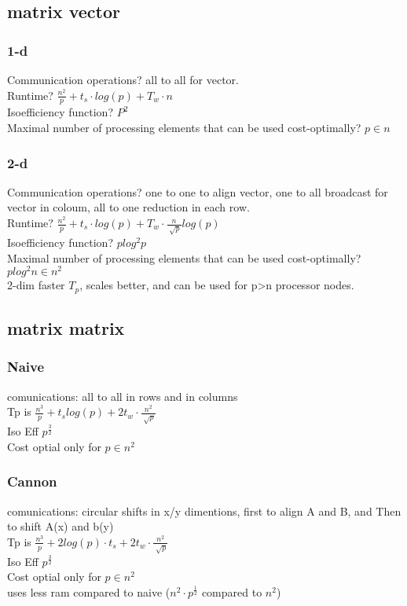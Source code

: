 \documentclass[a4paper,10pt,titlepage]{report}
\begin{document}
\subsection{matrix vector}
\subsubsection{1-d}
       Communication operations? all to all for vector.\\
       Runtime? $\frac{n^2}{p}+t_s \cdot log (p) + T_w\cdot n$\\
       Isoefficiency function? $P^2$\\
       Maximal number of processing elements that can be used cost-optimally? $p \in n $\\
\subsubsection{2-d}
       Communication operations? one to one to align vector, one to all broadcast for vector in coloum, all to one reduction in each row.\\
       Runtime? $\frac{n^2}{p}+t_s \cdot log (p) + T_w\cdot \frac{n}{\sqrt[]{p}}log (p)$\\
       Isoefficiency function? $ p log^2 p$\\
       Maximal number of processing elements that can be used cost-optimally? $p log^2 n \in n^2$\\
\vspace{5mm}
      2-dim faster $T_p$, scales better, and can be used for p>n processor nodes.
\subsection{matrix matrix}
\subsubsection{Naive}
       comunications: all to all in rows and in columns \\
       Tp is $\frac{n^3}{p}+t_s log(p)+2t_w\cdot \frac{n^2}{\sqrt[]{p}}$\\
       Iso Eff $p^{\frac{3}{2}}$\\
       Cost optial only for $p \in n^2$
\subsubsection{Cannon}
	   comunications: circular shifts in x/y dimentions, first to align A and B, and Then to shift A(x) and b(y) \\
       Tp is $\frac{n^3}{p}+2 log(p) \cdot t_s +2t_w\cdot \frac{n^2}{\sqrt[]{p}}$\\
       Iso Eff $p^{\frac{3}{2}}$\\
       Cost optial only for $p \in n^2$ \\
       uses less ram compared to naive ($n^2 \cdot p^{\frac{1}{2}}$ compared  to $ n^2$)\\
\end{document}

